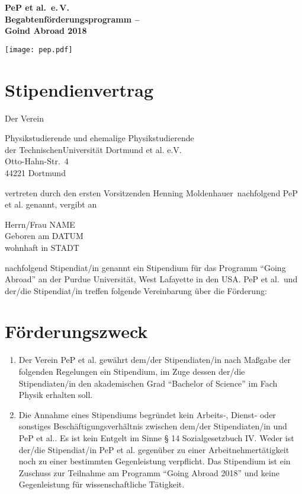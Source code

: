 \documentclass[
  paper=a4,
  fontsize=12pt,
  DIV=16,
  parskip=full,
  headinclude=true,
]{scrartcl}
\date{02. Februar 2015}
\newcommand\vorsitzender{Henning Moldenhauer}
\newcommand\stipyear{2018}    %
\newcommand\stipendiat{NAME}    %
\newcommand\stipgeburt{DATUM}   %
\newcommand\stipanschrift{STADT}  %
\begin{document}
  \begin{minipage}{0.45\textwidth}%
    \large\bfseries PeP et al.\ e.\,V.\\%
    Begabtenförderungsprogramm –\\%
    Goind Abroad \stipyear%
  \end{minipage}%
  \hfill%
  \begin{minipage}{0.45\textwidth}%
  \hfill\texttt{[image: pep.pdf]}
  \end{minipage}%
\section*{Stipendienvertrag}

Der Verein

Physikstudierende und ehemalige Physikstudierende\\
der TechnischenUniversität Dortmund et al. e.V.\\
Otto-Hahn-Str.~4\\
44221 Dortmund

vertreten durch den ersten Vorsitzenden \vorsitzender\ nachfolgend
PeP et al. genannt, vergibt an

Herrn/Frau \stipendiat \\
Geboren am \stipgeburt \\
wohnhaft in \stipanschrift

nachfolgend Stipendiat/in genannt ein Stipendium für das Programm
\enquote{Going Abroad} an der Purdue Universität, West Lafayette in den USA.
PeP et al.\ und der/die Stipendiat/in treffen folgende Vereinbarung über die
Förderung:

\section{Förderungszweck}

\begin{enumerate}[\qquad(1)]
  \item Der Verein PeP et al. gewährt dem/der Stipendiaten/in nach
    Maßgabe der folgenden Regelungen ein Stipendium, im Zuge dessen
    der/die Stipendiaten/in den akademischen Grad
    \enquote{Bachelor of Science} im Fach Physik erhalten soll.
  \item Die Annahme eines Stipendiums begründet kein Arbeits-, Dienst-
    oder sonstiges Beschäftigungsverhältnis zwischen dem/der
    Stipendiaten/in und PeP et al.. Es ist kein Entgelt im Sinne
    § 14 Sozialgesetzbuch IV. Weder ist der/die Stipendiat/in
    PeP et al. gegenüber zu einer Arbeitnehmertätigkeit
    noch zu einer bestimmten Gegenleistung verpflicht.
    Das Stipendium ist ein Zuschuss zur Teilnahme am Programm
    \enquote{Going Abroad \stipyear} und keine Gegenleistung für
    wissenschaftliche Tätigkeit.
\end{enumerate}
\end{document}
